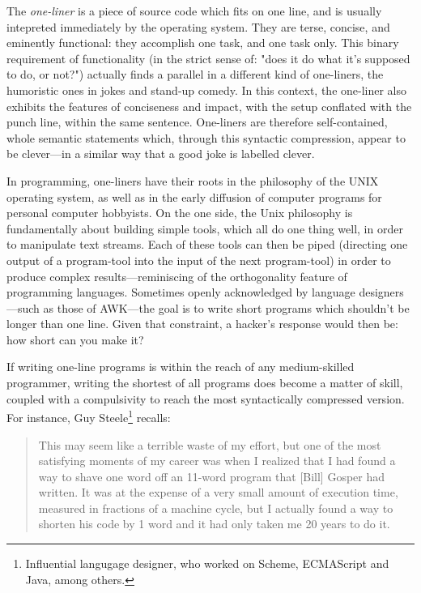 \documentclass{article}
\begin{document}
The \emph{one-liner} is a piece of source code which fits on one line, and is usually intepreted immediately by the operating system. They are terse, concise, and eminently functional: they accomplish one task, and one task only. This binary requirement of functionality (in the strict sense of: "does it do what it's supposed to do, or not?") actually finds a parallel in a different kind of one-liners, the humoristic ones in jokes and stand-up comedy. In this context, the one-liner also exhibits the features of conciseness and impact, with the setup conflated with the punch line, within the same sentence. One-liners are therefore self-contained, whole semantic statements which, through this syntactic compression, appear to be clever—in a similar way that a good joke is labelled clever.

In programming, one-liners have their roots in the philosophy of the UNIX operating system, as well as in the early diffusion of computer programs for personal computer hobbyists\cite{montfort_10_2014}. On the one side, the Unix philosophy is fundamentally about building simple tools, which all do one thing well, in order to manipulate text streams\cite{raymond_art_2003}. Each of these tools can then be piped (directing one output of a program-tool into the input of the next program-tool) in order to produce complex results—reminiscing of the orthogonality feature of programming languages. Sometimes openly acknowledged by language designers—such as those of AWK—the goal is to write short programs which shouldn't be longer than one line. Given that constraint, a hacker's response would then be: how short can you make it?

If writing one-line programs is within the reach of any medium-skilled programmer, writing the shortest of all programs does become a matter of skill, coupled with a compulsivity to reach the most syntactically compressed version. For instance, Guy Steele\footnote{Influential langugage designer, who worked on Scheme, ECMAScript and Java, among others.} recalls:

\begin{quote}
  This may seem like a terrible waste of my effort, but one of the most satisfying moments of my career was when I realized that I had found a way to shave one word off an 11-word program that [Bill] Gosper had written. It was at the expense of a very small amount of execution time, measured in fractions of a machine cycle, but I actually found a way to shorten his code by 1 word and it had only taken me 20 years to do it\cite{seibel_coders_2009}.
\end{quote}
\end{document}
